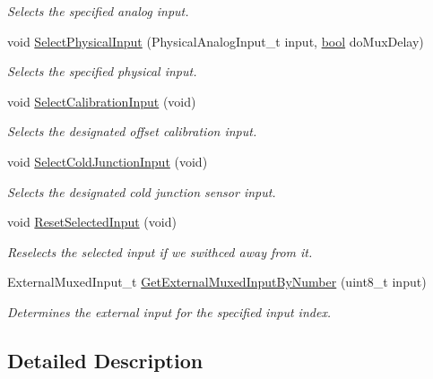 \begin{DoxyCompactItemize}
\begin{DoxyCompactList}\small\item\em Selects the specified analog input. \end{DoxyCompactList}\item 
void \hyperlink{group__analog__input__multiplexer_gab5cea2fc9723db50fa8b7c18c0ec0679}{Select\-Physical\-Input} (Physical\-Analog\-Input\-\_\-t input, \hyperlink{group__data__types_ga0ecf26b576b9a54eca656b9be7ba6a06}{bool} do\-Mux\-Delay)
\begin{DoxyCompactList}\small\item\em Selects the specified physical input. \end{DoxyCompactList}\item 
void \hyperlink{group__analog__input__multiplexer_gade4a88985454a90749affb88214a817e}{Select\-Calibration\-Input} (void)
\begin{DoxyCompactList}\small\item\em Selects the designated offset calibration input. \end{DoxyCompactList}\item 
void \hyperlink{group__analog__input__multiplexer_gae6210a53610863d94bea3968f43b4e88}{Select\-Cold\-Junction\-Input} (void)
\begin{DoxyCompactList}\small\item\em Selects the designated cold junction sensor input. \end{DoxyCompactList}\item 
void \hyperlink{group__analog__input__multiplexer_ga719b0357a9dca76e01dcc6a511cd8b7f}{Reset\-Selected\-Input} (void)
\begin{DoxyCompactList}\small\item\em Reselects the selected input if we swithced away from it. \end{DoxyCompactList}\item 
External\-Muxed\-Input\-\_\-t \hyperlink{group__analog__input__multiplexer_ga03f66c16ea15a425062a4b09c0bceba1}{Get\-External\-Muxed\-Input\-By\-Number} (uint8\-\_\-t input)
\begin{DoxyCompactList}\small\item\em Determines the external input for the specified input index. \end{DoxyCompactList}\end{DoxyCompactItemize}


\subsection{Detailed Description}


